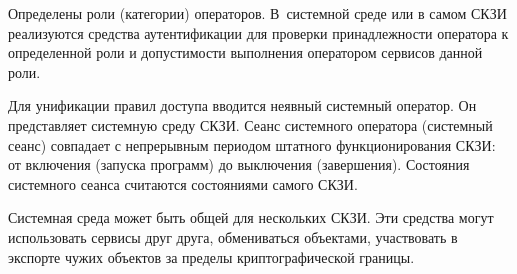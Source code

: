 
Определены роли (категории) операторов.
%
В~системной среде или в самом СКЗИ реализуются средства аутентификации для
проверки принадлежности оператора к определенной роли и допустимости выполнения
оператором сервисов данной роли.


Для унификации правил доступа вводится неявный системный оператор.
Он представляет системную среду СКЗИ. Сеанс системного оператора 
(системный сеанс) совпадает с непрерывным периодом штатного функционирования 
СКЗИ: от включения (запуска программ) до выключения (завершения).
%
Состояния системного сеанса считаются состояниями самого СКЗИ.


Системная среда может быть общей для нескольких СКЗИ. Эти средства могут 
использовать сервисы друг друга, обмениваться объектами, участвовать в экспорте 
чужих объектов за пределы криптографической границы.

